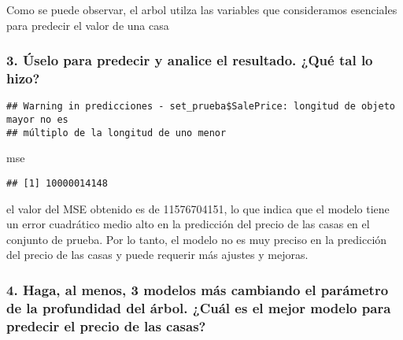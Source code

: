 \documentclass[
]{article}
\newenvironment{Shaded}{\begin{snugshade}}{\end{snugshade}}
\newcommand{\AttributeTok}[1]{\textcolor[rgb]{0.77,0.63,0.00}{#1}}
\newcommand{\DecValTok}[1]{\textcolor[rgb]{0.00,0.00,0.81}{#1}}
\newcommand{\FunctionTok}[1]{\textcolor[rgb]{0.00,0.00,0.00}{#1}}
\newcommand{\NormalTok}[1]{#1}
\newcommand{\OtherTok}[1]{\textcolor[rgb]{0.56,0.35,0.01}{#1}}
\newcommand{\SpecialCharTok}[1]{\textcolor[rgb]{0.00,0.00,0.00}{#1}}
\begin{document}
Como se puede observar, el arbol utilza las variables que consideramos
esenciales para predecir el valor de una casa

\hypertarget{uxfaselo-para-predecir-y-analice-el-resultado.-quuxe9-tal-lo-hizo}{%
\subsubsection{3. Úselo para predecir y analice el resultado. ¿Qué tal
lo
hizo?}\label{uxfaselo-para-predecir-y-analice-el-resultado.-quuxe9-tal-lo-hizo}}

\begin{Shaded}
\end{Shaded}

\begin{verbatim}
## Warning in predicciones - set_prueba$SalePrice: longitud de objeto mayor no es
## múltiplo de la longitud de uno menor
\end{verbatim}

\begin{Shaded}
\begin{Highlighting}[]
\NormalTok{mse}
\end{Highlighting}
\end{Shaded}

\begin{verbatim}
## [1] 10000014148
\end{verbatim}

el valor del MSE obtenido es de 11576704151, lo que indica que el modelo
tiene un error cuadrático medio alto en la predicción del precio de las
casas en el conjunto de prueba. Por lo tanto, el modelo no es muy
preciso en la predicción del precio de las casas y puede requerir más
ajustes y mejoras.

\hypertarget{haga-al-menos-3-modelos-muxe1s-cambiando-el-paruxe1metro-de-la-profundidad-del-uxe1rbol.-cuuxe1l-es-el-mejor-modelo-para-predecir-el-precio-de-las-casas}{%
\subsubsection{4. Haga, al menos, 3 modelos más cambiando el parámetro
de la profundidad del árbol. ¿Cuál es el mejor modelo para predecir el
precio de las
casas?}\label{haga-al-menos-3-modelos-muxe1s-cambiando-el-paruxe1metro-de-la-profundidad-del-uxe1rbol.-cuuxe1l-es-el-mejor-modelo-para-predecir-el-precio-de-las-casas}}
\end{document}

